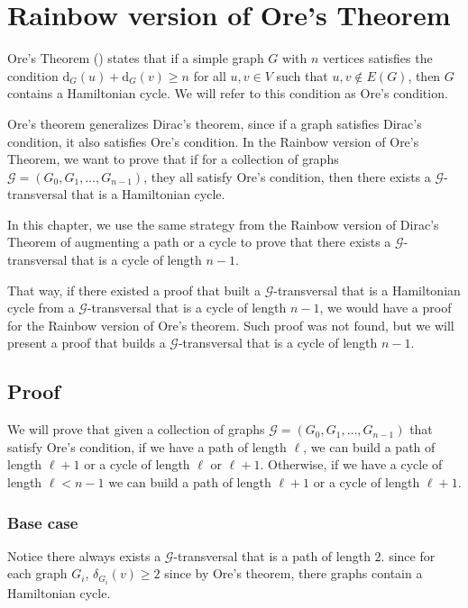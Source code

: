 
\chapter{Rainbow version of Ore's Theorem}
\label{chap:ore}

Ore's Theorem (\cite{Ore_1960}) states that if a simple graph $G$ with $n$ vertices satisfies the condition
$\text{d}_G(u) + \text{d}_G(v) \geq n$ for all $u, v \in V$ such that ${u, v} \not\in E(G)$, then $G$ contains a Hamiltonian cycle.
We will refer to this condition as Ore's condition.

Ore's theorem generalizes Dirac's theorem, since if a graph satisfies Dirac's condition, it also satisfies Ore's condition.
In the Rainbow version of Ore's Theorem, we want to prove that if for a collection of graphs $\mathcal{G} = (G_0, G_1, \ldots, G_{n-1})$, they all satisfy Ore's condition,
then there exists a $\mathcal{G}$-transversal that is a Hamiltonian cycle.

In this chapter, we use the same strategy from the 
Rainbow version of Dirac's Theorem of augmenting a path or a cycle   
to prove that there exists a $\mathcal{G}$-transversal that is a cycle of length $n - 1$.

That way, if there existed a proof that built a 
$\mathcal{G}$-transversal that is a Hamiltonian cycle from a
$\mathcal{G}$-transversal that is a cycle of length $n - 1$, 
we would have a proof for the Rainbow version of Ore's theorem.
Such proof was not found,
but we will present a proof that builds a $\mathcal{G}$-transversal 
that is a cycle of length $n - 1$.


\section{Proof}

We will prove that given a collection of graphs $\mathcal{G} = (G_0, G_1, \ldots, G_{n-1})$ 
that satisfy Ore's condition,
if we have a path of length $\ell$, we can build a path of length $\ell + 1$  or 
a cycle of length $\ell$ or $\ell + 1$.
Otherwise, if we have a cycle of length $\ell < n - 1$ 
we can build a path of length $\ell + 1$ or a cycle of length $\ell + 1$.

\subsection{Base case}

Notice there always exists a $\mathcal{G}$-transversal that is a path of length $2$.
since for each graph $G_i$, $\delta_{G_i}(v) \geq 2$ since by Ore's theorem,
there graphs contain a Hamiltonian cycle. 

